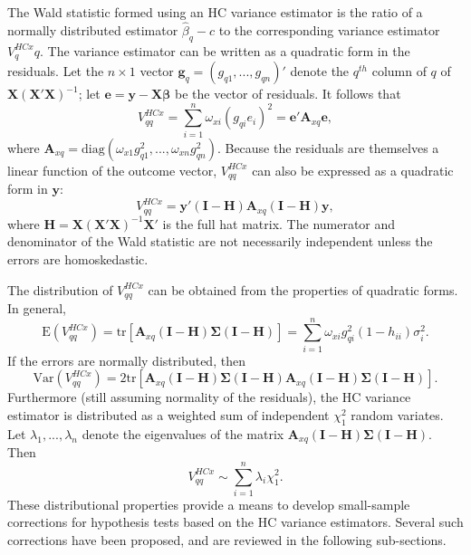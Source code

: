 \documentclass{article}\usepackage[]{graphicx}\usepackage[]{color}
\newcommand{\E}{\text{E}}
\newcommand{\Var}{\text{Var}}
\newcommand{\tr}{\text{tr}}
\newcommand{\diag}{\text{diag}}
\newcommand{\bm}{\mathbf}
\newcommand{\bs}{\boldsymbol}
\begin{document}
The Wald statistic formed using an HC variance estimator is the ratio of a normally distributed estimator $\hat\beta_q - c$ to the corresponding variance estimator $V^{HCx}_qq$. The variance estimator can be written as a quadratic form in the residuals. Let the $n \times 1$ vector $\bm{g}_q = (g_{q1},...,g_{qn})'$ denote the $q^{th}$ column of $q$ of $\bm{X}\left(\bm{X}'\bm{X}\right)^{-1}$; let $\bm{e} = \bm{y} - \bm{X}\bs\beta$ be the vector of residuals. It follows that 
\begin{equation}
V^{HCx}_{qq} = \sum_{i=1}^n \omega_{xi} \left(g_{qi} e_i\right)^2 = \bm{e}' \bm{A}_{xq} \bm{e},
\end{equation}
where $\bm{A}_{xq} = \diag\left(\omega_{x1} g_{q1}^2, ..., \omega_{xn} g_{qn}^2\right)$. Because the residuals are themselves a linear function of the outcome vector, $V^{HCx}_{qq}$ can also be expressed as a quadratic form in $\bm{y}$: 
\[
V^{HCx}_{qq} = \bm{y}'\left(\bm{I} - \bm{H}\right) \bm{A}_{xq} \left(\bm{I} - \bm{H}\right) \bm{y}, \]
where $\bm{H} = \bm{X}\left(\bm{X}'\bm{X}\right)^{-1} \bm{X}'$ is the full hat matrix. The numerator and denominator of the Wald statistic are not necessarily independent unless the errors are homoskedastic. 

The distribution of $V^{HCx}_{qq}$ can be obtained from the properties of quadratic forms. In general, \[
\E\left(V^{HCx}_{qq}\right) = \tr\left[\bm{A}_{xq} \left(\bm{I} - \bm{H}\right)\bs\Sigma\left(\bm{I} - \bm{H}\right) \right] = \sum_{i=1}^n \omega_{xi} g_{qi}^2 (1 - h_{ii}) \sigma_i^2. \]
If the errors are normally distributed, then \[
\Var\left(V^{HCx}_{qq}\right) = 2\tr\left[\bm{A}_{xq} \left(\bm{I} - \bm{H}\right)\bs\Sigma\left(\bm{I} - \bm{H}\right) \bm{A}_{xq} \left(\bm{I} - \bm{H}\right)\bs\Sigma\left(\bm{I} - \bm{H}\right)\right]. \]
Furthermore (still assuming normality of the residuals), the HC variance estimator is distributed as a weighted sum of independent $\chi^2_1$ random variates. Let $\lambda_1,...,\lambda_n$ denote the eigenvalues of the matrix $\bm{A}_{xq} \left(\bm{I} - \bm{H}\right)\bs\Sigma\left(\bm{I} - \bm{H}\right)$. Then 
\begin{equation}
\label{eq:quadratic_dist}
V^{HCx}_{qq} \sim \sum_{i=1}^n \lambda_i \chi^2_1.
\end{equation}
These distributional properties provide a means to develop small-sample corrections for hypothesis tests based on the HC variance estimators. Several such corrections have been proposed, and are reviewed in the following sub-sections. 
\end{document}
